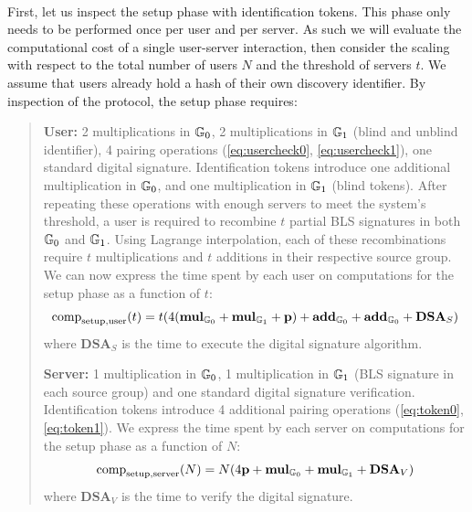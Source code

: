 	\paragraph{} First, let us inspect the setup phase with identification tokens. This phase only needs to be performed once per user and per server. As such we will evaluate the computational cost of a single user-server interaction, then consider the scaling with respect to the total number of users $N$ and the threshold of servers $t$. We assume that users already hold a hash of their own discovery identifier. By inspection of the protocol, the setup phase requires: 
	\begin{quote}
		\textbf{User:} 2 multiplications in $\mathbb{G}_0$, 2 multiplications in $\mathbb{G}_1$ (blind and unblind identifier), 4 pairing operations (\autoref{eq:usercheck0}, \autoref{eq:usercheck1}), one standard digital signature. Identification tokens introduce one additional multiplication in $\mathbb{G}_0$, and one multiplication in $\mathbb{G}_1$ (blind tokens). After repeating these operations with enough servers to meet the system's threshold, a user is required to recombine $t$ partial BLS signatures in both $\mathbb{G}_0$ and $\mathbb{G}_1$. Using Lagrange interpolation, each of these recombinations require $t$ multiplications and $t$ additions in their respective source group. We can now express the time spent by each user on computations for the setup phase as a function of $t$:
		\begin{equation}
			\mathrm{comp}_{\mathrm{setup, user}}(t) = t(4(\mathbf{mul}_{\mathbb{G}_0} + \mathbf{mul}_{\mathbb{G}_1} + \mathbf{p}) + \mathbf{add}_{\mathbb{G}_0} + \mathbf{add}_{\mathbb{G}_0} + \mathbf{DSA}_S)
		\end{equation}
		\noindent where $\mathbf{DSA}_S$ is the time to execute the digital signature algorithm.
		
				
		\textbf{Server:} 1 multiplication in $\mathbb{G}_0$, 1 multiplication in $\mathbb{G}_1$ (BLS signature in each source group) and one standard digital signature verification. Identification tokens introduce 4 additional pairing operations (\autoref{eq:token0}, \autoref{eq:token1}). We express the time spent by each server on computations for the setup phase as a function of $N$:
		\begin{equation}
			\mathrm{comp}_{\mathrm{setup, server}}(N) = N(4\mathbf{p} + \mathbf{mul}_{\mathbb{G}_0} + \mathbf{mul}_{\mathbb{G}_1} + \mathbf{DSA}_V)
		\end{equation}
		\noindent where $\mathbf{DSA}_V$ is the time to verify the digital signature.
	\end{quote}
	
